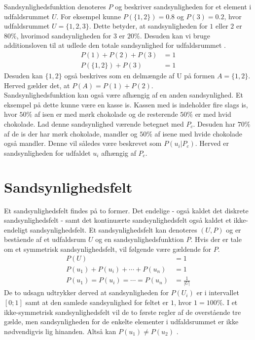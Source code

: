 \documentclass[../../SRP.tex]{subfiles}
\begin{document}
Sandsynlighedsfunktion denoteres $P$ og beskriver sandsynligheden for et element i udfaldsrummet $U$. For eksempel kunne $P(\{1,2\}) = 0.8$ og $P(3) = 0.2$, hvor udfaldsrummet $U = \{1,2,3\}$. Dette betyder, at sandsynligheden for $1$ eller $2$ er $80\%$, hvorimod sandsynligheden for $3$ er $20\%$. Desuden kan vi bruge additionsloven til at udlede den totale sandsynlighed for udfaldsrummet \cite{SC}.
\begin{align}
  P(1) + P(2) + P(3) &= 1 \\
  P(\{1,2\}) + P(3) &= 1
\end{align}
Desuden kan $\{1,2\}$ også beskrives som en delmængde af U på formen $A = \{1,2\}$. Herved gælder det, at $P(A) = P(1) + P(2)$. \\

Sandsynlighedsfunktion kan også være afhængig af en anden sandsynlighed. Et eksempel på dette kunne være en kasse is. Kassen med is indeholder fire slags is, hvor $50\%$ af isen er med mørk chokolade og de resterende $50\%$ er med hvid chokolade. Lad denne sandsynlighed værende betegnet med $P_c$. Desuden har $70\%$ af de is der har mørk chokolade, mandler og $50\%$ af isene med hvide chokolade også mandler. Denne vil således være beskrevet som $P(u_i | P_c)$. Herved er sandsynligheden for udfaldet $u_i$ afhængig af $P_c$.

\section{Sandsynlighedsfelt}

Et sandsynlighedsfelt findes på to former. Det endelige - også kaldet det diskrete sandsynlighedsfelt - samt det kontinuærte sandsynlighedsfelt også kaldet et ikke-endeligt sandsynlighedsfelt. Et sandsynlighedsfelt kan denoteres $(U, P)$ og er bestående af et udfaldsrum $U$ og en sandsynlighedsfunktion $P$. Hvis der er tale om et symmetrisk sandsynlighedsfelt, vil følgende være gældende for $P$.
\begin{align}
  P(U) &= 1 \\
  P(u_1) + P(u_i) + \dotsb + P(u_n) &= 1 \\
  P(u_1) = P(u_i) = \dotsb = P(u_n) &= \frac{1}{|U|}
\end{align}
De to udsagn udtrykker derved at sandsynligheden for $P(U_i)$ er i intervallet $[0;1]$ samt at den samlede sandsynlighed for feltet er $1$, hvor $1 = 100\%$. I et ikke-symmetrisk sandsynlighedsfelt vil de to første regler af de overstående tre gælde, men sandsynligheden for de enkelte elementer i udfaldsrummet er ikke nødvendigvis lig hinanden. Altså kan $P(u_1) \neq P(u_2)$ \cite{SC}.\\
\end{document}
